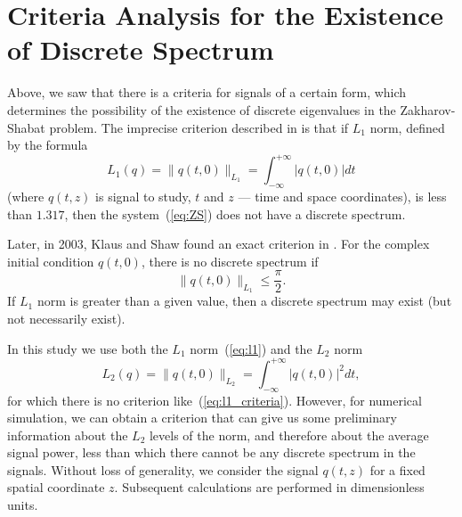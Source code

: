 \section{Criteria Analysis for the Existence of Discrete Spectrum}

Above, we saw that there is a criteria for signals of a certain form, which determines the possibility of the existence of discrete eigenvalues in the Zakharov-Shabat problem. The imprecise criterion described in \cite{novikov1984theory} is that if $L_1$ norm, defined by the formula 
\begin{equation}
    L_1(q) = \lVert q (t, 0) \rVert_{L_1} = \int^{+ \infty}_{ - \infty} | q (t, 0) | dt  
    \label{eq:l1}
\end{equation}
(where $q(t,z)$ is signal to study, $t$ and $z$ --- time and space coordinates),
is less than $ 1.317 $, then the system~(\ref{eq:ZS}) does not have a discrete spectrum.

Later, in 2003, Klaus and Shaw found an exact criterion in \cite{klaus2003}.
For the complex initial condition $q (t, 0)$, there is no discrete spectrum if
\begin{equation}
    \lVert q(t, 0) \rVert_{L_1} \leq \frac{\pi}{2} {.}
    \label{eq:l1_criteria}
\end{equation}
If $ L_1 $ norm is greater than a given value, then a discrete spectrum may exist (but not necessarily exist).

In this study we use both the $ L_1 $ norm~(\ref{eq:l1}) and the $ L_2 $ norm
\begin{equation}
    L_2(q) = \lVert q (t, 0) \rVert_{L_2} = \int^{+ \infty}_{ - \infty} | q (t, 0) |^2 dt {,} 
    \label{eq:l2}
\end{equation}
for which there is no criterion like~(\ref{eq:l1_criteria}). However, for numerical simulation, we can obtain a criterion that can give us some preliminary information about the $L_2$ levels of the norm, and therefore about the average signal power, less than which there cannot be any discrete spectrum in the signals. Without loss of generality, we consider the signal $q (t, z)$ for a fixed spatial coordinate $z$. Subsequent calculations are performed in dimensionless units.

